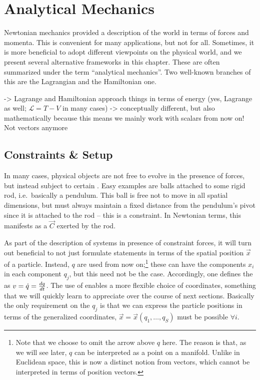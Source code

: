 \documentclass[../class_mech_main.tex]{subfiles}
\begin{document}
\chapter{Analytical Mechanics}

Newtonian mechanics provided a description of the world in terms of forces and momenta. This is convenient for many applications, but not for all. Sometimes, it is more beneficial to adopt different viewpoints on the physical world, and we present several alternative frameworks in this chapter. These are often summarized under the term \enquote{analytical mechanics}. Two well-known branches of this are the Lagrangian and the Hamiltonian one.




-> Lagrange and Hamiltonian approach things in terms of energy (yes, Lagrange as well; $\mathcal{L} = T - V$ in many cases) -> conceptually different, but also mathematically because this means we mainly work with scalars from now on! Not vectors anymore



	\section{Constraints \& Setup}
In many cases, physical objects are not free to evolve in the presence of forces, but instead subject to certain . Easy examples are balls attached to some rigid rod, i.e.~basically a pendulum. This ball is free not to move in all spatial dimensions, but must always maintain a fixed distance from the pendulum's pivot since it is attached to the rod -- this is a constraint. In Newtonian terms, this manifests as a  $\vec{C}$ exerted by the rod.


As part of the description of systems in presence of constraint forces, it will turn out beneficial to not just formulate statements in terms of the spatial position $\vec{x}$ of a particle. Instead,  $q$ are used from now on;\footnote{Note that we choose to omit the arrow above $q$ here. The reason is that, as we will see later, $q$ can be interpreted as a point on a manifold. Unlike in Euclidean space, this is now a distinct notion from vectors, which cannot be interpreted in terms of position vectors.} these can have the components $x_i$ in each component $q_j$, but this need not be the case. Accordingly, one defines the  as $v = \dot{q} = \dv{q}{t}$. The use of enables a more flexible choice of coordinates, something that we will quickly learn to appreciate over the course of next sections. Basically the only requirement on the $q_j$ is that we can express the particle positions in terms of the generalized coordinates, $\vec{x} = \vec{x}(q_1, \dots, q_S)$ must be possible $\forall i$.
\end{document}
